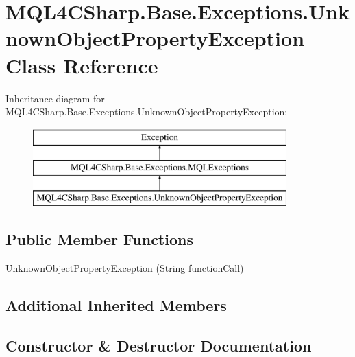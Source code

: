 \hypertarget{class_m_q_l4_c_sharp_1_1_base_1_1_exceptions_1_1_unknown_object_property_exception}{}\section{M\+Q\+L4\+C\+Sharp.\+Base.\+Exceptions.\+Unknown\+Object\+Property\+Exception Class Reference}
\label{class_m_q_l4_c_sharp_1_1_base_1_1_exceptions_1_1_unknown_object_property_exception}
Inheritance diagram for M\+Q\+L4\+C\+Sharp.\+Base.\+Exceptions.\+Unknown\+Object\+Property\+Exception\+:\begin{figure}[H]
\begin{center}
\leavevmode
\includegraphics[height=3.000000cm]{class_m_q_l4_c_sharp_1_1_base_1_1_exceptions_1_1_unknown_object_property_exception}
\end{center}
\end{figure}
\subsection*{Public Member Functions}
\begin{DoxyCompactItemize}
\item 
\hyperlink{class_m_q_l4_c_sharp_1_1_base_1_1_exceptions_1_1_unknown_object_property_exception_adab95ba6b4f556127193745c7948f51e}{Unknown\+Object\+Property\+Exception} (String function\+Call)
\end{DoxyCompactItemize}
\subsection*{Additional Inherited Members}


\subsection{Constructor \& Destructor Documentation}
